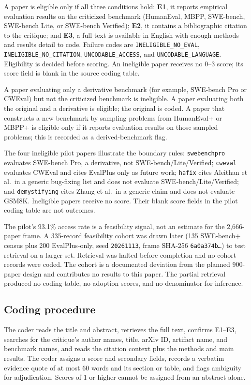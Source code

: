 \documentclass[11pt,a4paper]{article}
\newcommand{\key}[1]{\texttt{\small #1}}
\begin{document}
A paper is eligible only if all three conditions hold: \textbf{E1}, it reports empirical evaluation results on the criticized benchmark (HumanEval, MBPP, SWE-bench, SWE-bench Lite, or SWE-bench Verified); \textbf{E2}, it contains a bibliographic citation to the critique; and \textbf{E3}, a full text is available in English with enough methods and results detail to code. Failure codes are \texttt{INELIGIBLE\_NO\_EVAL}, \texttt{INELIGIBLE\_NO\_CITATION}, \texttt{UNCODABLE\_ACCESS}, and \texttt{UNCODABLE\_LANGUAGE}. Eligibility is decided before scoring. An ineligible paper receives no 0--3 score; its score field is blank in the source coding table.

A paper evaluating only a derivative benchmark (for example, SWE-bench Pro or CWEval) but not the criticized benchmark is ineligible. A paper evaluating both the original and a derivative is eligible; the original is coded. A paper that constructs a new benchmark by sampling problems from HumanEval+ or MBPP+ is eligible only if it reports evaluation results on those sampled problems; this is recorded as a derived-benchmark flag.

The four ineligible pilot papers illustrate the boundary rules: \key{swebenchpro} evaluates SWE-bench Pro, a derivative, not SWE-bench/Lite/Verified; \key{cweval} evaluates CWEval and cites EvalPlus only as future work; \key{hafix} cites Aleithan et al.\ in a generic bug-fixing list and does not evaluate SWE-bench/Lite/Verified; and \key{demystifying} cites Zhang et al.\ in a generic claim and does not evaluate GSM8K. Ineligible papers receive no score. Their blank score fields in the pilot coding table are not outcomes.

The pilot's 93.1\% access rate is a feasibility signal, not an estimate for the 2,666-paper frame. A 335-record feasibility cohort was drawn later (135 SWE-bench+ census plus 200 EvalPlus-only, seed \texttt{20261113}, frame SHA-256 \texttt{6a0a374b\ldots}) to test retrieval on a larger set. Retrieval was halted before completion and no cohort records were coded. The cohort is a documented deviation from the planned 900-paper design and contributes no results to this paper. The partial retrieval produced no coding table, no adoption scores, and no denominator for inference.

\subsection{Coding procedure}

The coder reads the title and abstract, retrieves the full text, confirms E1--E3, searches for the critique's author names, title, arXiv ID, artifact name, and benchmark names, and reads the citation context plus the methods and main results. The coder assigns a score and secondary fields, records a verbatim evidence quote of at most 60 words and its section or table, and flags ambiguity for adjudication. Scores of 1 or higher cannot be assigned from an abstract alone.
\end{document}
